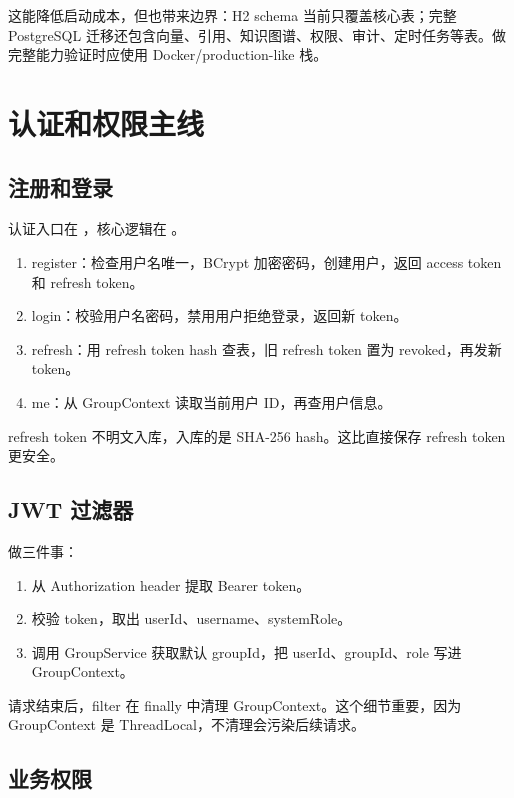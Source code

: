 \documentclass[UTF8,zihao=-4]{ctexart}
\begin{document}
这能降低启动成本，但也带来边界：H2 schema 当前只覆盖核心表；完整 PostgreSQL 迁移还包含向量、引用、知识图谱、权限、审计、定时任务等表。做完整能力验证时应使用 Docker/production-like 栈。

\section{认证和权限主线}

\subsection{注册和登录}

认证入口在 ，核心逻辑在 。

\begin{enumerate}
  \item register：检查用户名唯一，BCrypt 加密密码，创建用户，返回 access token 和 refresh token。
  \item login：校验用户名密码，禁用用户拒绝登录，返回新 token。
  \item refresh：用 refresh token hash 查表，旧 refresh token 置为 revoked，再发新 token。
  \item me：从 GroupContext 读取当前用户 ID，再查用户信息。
\end{enumerate}

refresh token 不明文入库，入库的是 SHA-256 hash。这比直接保存 refresh token 更安全。

\subsection{JWT 过滤器}

 做三件事：

\begin{enumerate}
  \item 从 Authorization header 提取 Bearer token。
  \item 校验 token，取出 userId、username、systemRole。
  \item 调用 GroupService 获取默认 groupId，把 userId、groupId、role 写进 GroupContext。
\end{enumerate}

请求结束后，filter 在 finally 中清理 GroupContext。这个细节重要，因为 GroupContext 是 ThreadLocal，不清理会污染后续请求。

\subsection{业务权限}
\end{document}
